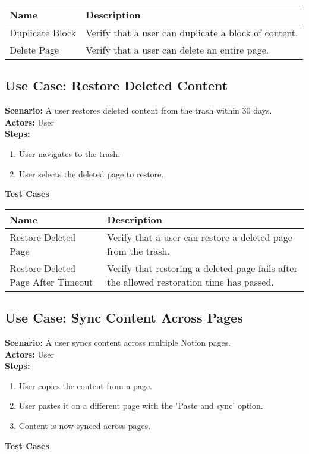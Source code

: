 \documentclass{article}
\begin{document}
            \begin{longtable}{|p{}|p{}|}
            \hline
            \textbf{Name} & \textbf{Description} \\
            \hline
            Duplicate Block & Verify that a user can duplicate a block of content. \\
\hline
Delete Page & Verify that a user can delete an entire page. \\
\hline
\end{longtable}\subsection{\textbf{Use Case: Restore Deleted Content}}
\textbf{Scenario:} A user restores deleted content from the trash within 30 days.\\
\textbf{Actors:} User\\
\textbf{Steps:}
\begin{enumerate}
\item User navigates to the trash.
\item User selects the deleted page to restore.
\end{enumerate}
\textbf{Test Cases}

            \begin{longtable}{|p{}|p{}|}
            \hline
            \textbf{Name} & \textbf{Description} \\
            \hline
            Restore Deleted Page & Verify that a user can restore a deleted page from the trash. \\
\hline
Restore Deleted Page After Timeout & Verify that restoring a deleted page fails after the allowed restoration time has passed. \\
\hline
\end{longtable}\subsection{\textbf{Use Case: Sync Content Across Pages}}
\textbf{Scenario:} A user syncs content across multiple Notion pages.\\
\textbf{Actors:} User\\
\textbf{Steps:}
\begin{enumerate}
\item User copies the content from a page.
\item User pastes it on a different page with the 'Paste and sync' option.
\item Content is now synced across pages.
\end{enumerate}
\textbf{Test Cases}
\end{document}
